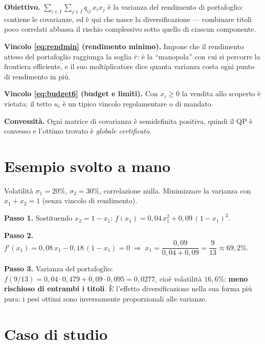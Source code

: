 \begin{spiegazione}
\textbf{Obiettivo.} $\sum_{i \in I}\sum_{j \in I} q_{ij}\, x_i x_j$ è la varianza del rendimento
di portafoglio: contiene le covarianze, ed è qui che nasce la diversificazione ---
combinare titoli poco correlati abbassa il rischio complessivo sotto quello di ciascun
componente.

\textbf{Vincolo \eqref{eq:rendmin} (rendimento minimo).} Impone che il rendimento
atteso del portafoglio raggiunga la soglia $\bar r$: è la ``manopola'' con cui si
percorre la frontiera efficiente, e il suo moltiplicatore dice quanta varianza costa
ogni punto di rendimento in più.

\textbf{Vincolo \eqref{eq:budget6} (budget e limiti).} Con $x_i \ge 0$ la vendita allo scoperto è
vietata; il tetto $u_i$ è un tipico vincolo regolamentare o di mandato.

\textbf{Convessità.} Ogni matrice di covarianza è semidefinita positiva, quindi il QP
è convesso e l'ottimo trovato è \emph{globale certificato}.
\end{spiegazione}

\section{Esempio svolto a mano}

\begin{esempio}
Volatilità $\sigma_1 = 20\%$, $\sigma_2 = 30\%$, correlazione nulla. Minimizzare la
varianza con $x_1 + x_2 = 1$ (senza vincolo di rendimento).

\textbf{Passo 1.} Sostituendo $x_2 = 1 - x_1$:
$f(x_1) = 0{,}04\,x_1^2 + 0{,}09\,(1 - x_1)^2$.

\textbf{Passo 2.} $f'(x_1) = 0{,}08\,x_1 - 0{,}18\,(1 - x_1) = 0
\;\Rightarrow\; x_1 = \dfrac{0{,}09}{0{,}04 + 0{,}09} = \dfrac{9}{13} \approx 69{,}2\%$.

\textbf{Passo 3.} Varianza del portafoglio:
$f(9/13) = 0{,}04 \cdot 0{,}479 + 0{,}09 \cdot 0{,}095 = 0{,}0277$, cioè volatilità
$16{,}6\%$: \textbf{meno rischioso di entrambi i titoli}. È l'effetto diversificazione
nella sua forma più pura: i pesi ottimi sono inversamente proporzionali alle varianze.
\end{esempio}

\section{Caso di studio}

